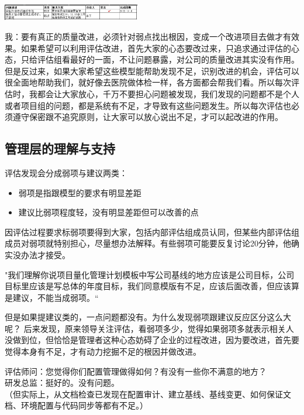 \includegraphics[width=6cm]{IssuesScreenshot_2022-10-19_205655.jpg}

我：要有真正的质量改进，必须针对弱点找出根因，变成一个改进项目去做才有效果。如果希望可以利用评估改进，首先大家的心态要改过来，只追求通过评估的心态，只给评估组看最好的一面，不让问题暴露，对公司的质量改进其实没有作用。但是反过来，如果大家希望这些模型能帮助发现不足，识别改进的机会，评估可以很全面地帮助我们，就好像去医院做体检一样，各方面都会帮我们看。所以每次评估时，我都会让大家放心，千万不要担心问题被发现，我们发现的问题都不是个人或者项目组的问题，都是系统有不足，才导致有这些问题发生。所以每次评估也必须遵守保密跟不追究原则，让大家可以放心说出不足，才可以起改进的作用。

\hypertarget{ux7ba1ux7406ux5c42ux7684ux7406ux89e3ux4e0eux652fux6301}{%
\subsection{管理层的理解与支持}\label{ux7ba1ux7406ux5c42ux7684ux7406ux89e3ux4e0eux652fux6301}}

评估发现会分成弱项与建议两类：

\begin{itemize}
\tightlist
\item
  弱项是指跟模型的要求有明显差距
\item
  建议比弱项程度轻，没有明显差距但可以改善的点\\
\end{itemize}

因评估过程要求标弱项要得到大家，包括内部评估组成员认同，但某些内部评估组成员对弱项就特别担心，尽量想办法解释。有些弱项可能要反复讨论20分钟，他确实没办法才接受。

"我们理解你说项目量化管理计划模板中写公司基线的地方应该是公司目标，公司目标里应该是写总体的年度目标，我们同意模版有不足，应该后面改善，但应该算是建议，不能当成弱项。``

但是如果提建议类的，一点问题都没有。为什么发现弱项跟建议反应区分这么大呢？
后来发现，原来领导关注评估，看弱项多少，觉得如果弱项多就表示相关人没做到位，但恰恰是管理者这种心态妨碍了企业的过程改进，因为要改进，首先要觉得本身有不足，才有动力挖掘不足的根因并做改进。

评估师问：您觉得你们配置管理做得如何？有没有一些你不满意的地方？\\
研发总监：挺好的。没有问题。\\
（但实际上，从文档检查已发现在配置审计、建立基线、基线变更、如何保证文档、环境配置与代码同步等都有不足。）

